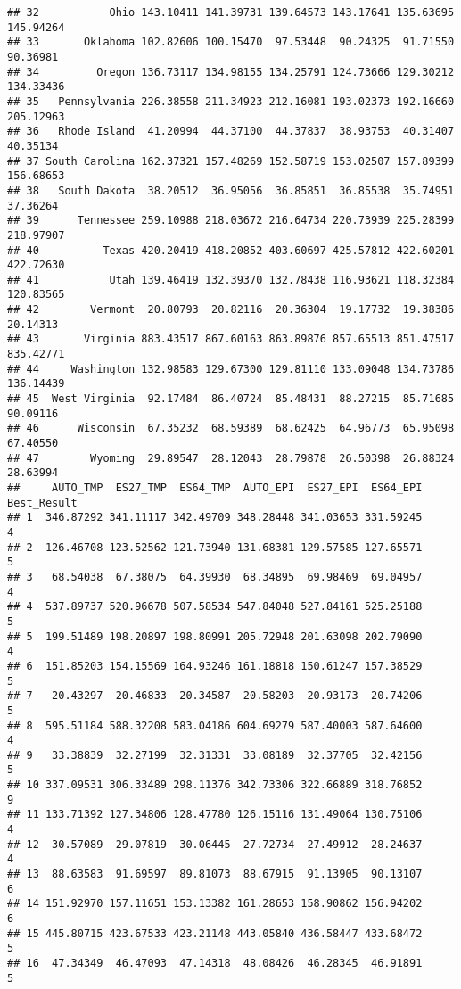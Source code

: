 \documentclass[
]{article}
\begin{document}
\begin{verbatim}
## 32           Ohio 143.10411 141.39731 139.64573 143.17641 135.63695 145.94264
## 33       Oklahoma 102.82606 100.15470  97.53448  90.24325  91.71550  90.36981
## 34         Oregon 136.73117 134.98155 134.25791 124.73666 129.30212 134.33436
## 35   Pennsylvania 226.38558 211.34923 212.16081 193.02373 192.16660 205.12963
## 36   Rhode Island  41.20994  44.37100  44.37837  38.93753  40.31407  40.35134
## 37 South Carolina 162.37321 157.48269 152.58719 153.02507 157.89399 156.68653
## 38   South Dakota  38.20512  36.95056  36.85851  36.85538  35.74951  37.36264
## 39      Tennessee 259.10988 218.03672 216.64734 220.73939 225.28399 218.97907
## 40          Texas 420.20419 418.20852 403.60697 425.57812 422.60201 422.72630
## 41           Utah 139.46419 132.39370 132.78438 116.93621 118.32384 120.83565
## 42        Vermont  20.80793  20.82116  20.36304  19.17732  19.38386  20.14313
## 43       Virginia 883.43517 867.60163 863.89876 857.65513 851.47517 835.42771
## 44     Washington 132.98583 129.67300 129.81110 133.09048 134.73786 136.14439
## 45  West Virginia  92.17484  86.40724  85.48431  88.27215  85.71685  90.09116
## 46      Wisconsin  67.35232  68.59389  68.62425  64.96773  65.95098  67.40550
## 47        Wyoming  29.89547  28.12043  28.79878  26.50398  26.88324  28.63994
##     AUTO_TMP  ES27_TMP  ES64_TMP  AUTO_EPI  ES27_EPI  ES64_EPI Best_Result
## 1  346.87292 341.11117 342.49709 348.28448 341.03653 331.59245           4
## 2  126.46708 123.52562 121.73940 131.68381 129.57585 127.65571           5
## 3   68.54038  67.38075  64.39930  68.34895  69.98469  69.04957           4
## 4  537.89737 520.96678 507.58534 547.84048 527.84161 525.25188           5
## 5  199.51489 198.20897 198.80991 205.72948 201.63098 202.79090           4
## 6  151.85203 154.15569 164.93246 161.18818 150.61247 157.38529           5
## 7   20.43297  20.46833  20.34587  20.58203  20.93173  20.74206           5
## 8  595.51184 588.32208 583.04186 604.69279 587.40003 587.64600           4
## 9   33.38839  32.27199  32.31331  33.08189  32.37705  32.42156           5
## 10 337.09531 306.33489 298.11376 342.73306 322.66889 318.76852           9
## 11 133.71392 127.34806 128.47780 126.15116 131.49064 130.75106           4
## 12  30.57089  29.07819  30.06445  27.72734  27.49912  28.24637           4
## 13  88.63583  91.69597  89.81073  88.67915  91.13905  90.13107           6
## 14 151.92970 157.11651 153.13382 161.28653 158.90862 156.94202           6
## 15 445.80715 423.67533 423.21148 443.05840 436.58447 433.68472           5
## 16  47.34349  46.47093  47.14318  48.08426  46.28345  46.91891           5

\end{verbatim}
\end{document}
